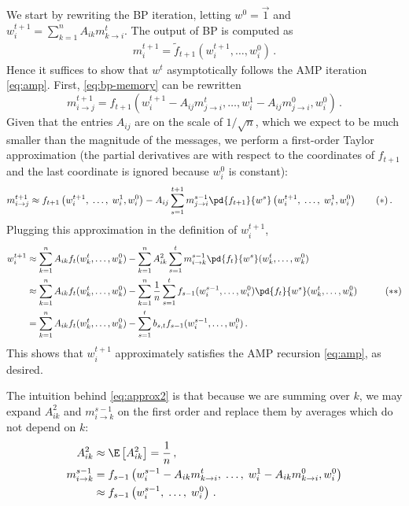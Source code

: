 \documentclass[12pt]{article}
\newcommand{\sdots}{\;\dots,\;}
\begin{document}
We start by rewriting the BP iteration, letting $w^0=\vec{1}$ and $w_i^{t+1}=\sum_{k=1}^n A_{ik} m^t_{k\to i}$. The output of BP is computed as
\begin{align*}
    m^{t+1}_i = \widetilde{f}_{t+1}\left(w_i^{t+1}, \dots, w_i^0\right)\,.
\end{align*}
Hence it suffices to show that $w^t$ asymptotically follows the AMP iteration \cref{eq:amp}. First, \cref{eq:bp-memory} can be rewritten
\[
    m^{t+1}_{i\to j} = f_{t+1}\left(w_i^{t+1} - A_{ij} m^t_{j\to i}, \ldots, w^1_{i} - A_{ij} m^0_{j\to i},w^0_i\right)\,.
\]
Given that the entries $A_{ij}$ are on the scale of $1/\sqrt n$, which we expect to be much smaller than the magnitude of the messages, we perform a first-order Taylor approximation (the partial derivatives
are with respect to the coordinates of $f_{t+1}$ and the last coordinate is ignored because $w^0_i$ is constant):
\begin{align*}
    m^{t+1}_{i\to j}&\approx f_{t+1}\left(w^{t+1}_i, \sdots w^1_i, w_i^0\right) - A_{ij}\sum_{s = 1}^{t+1} m_{j \to i}^{s-1} \pd{f_{t+1}}{w^s}\left(w^{t+1}_i, \sdots w^1_i, w_i^0\right)\label{eq:approx1}\tag{$\ast$}\,.
\end{align*}
Plugging this approximation in the definition of $w^{t+1}_i$,
\begingroup
\allowdisplaybreaks
\begin{align*}
    w^{t+1}_i &\approx \sum_{k =1}^n A_{ik} f_t(w_k^t, \dots, w_k^0) - \sum_{k=1}^n A_{ik}^2 \sum_{s=1}^{t}   m^{s-1}_{i\to k} \pd{f_{t}}{w^s}(w_k^t, \dots, w_k^0) &\\
    &\approx \sum_{k=1}^n A_{ik} f_t(w_k^t, \dots, w_k^0) - \sum_{k=1}^n \frac 1 n \sum_{s=1}^{t}   f_{s-1}(w_i^{s-1}, \dots, w_i^0) \pd{f_t}{w^s}(w_k^t, \dots, w_k^0) & \label{eq:approx2}\tag{$\ast\ast$}\\
    &= \sum_{k=1}^n A_{ik} f_t(w_k^t, \dots, w_k^0) -  \sum_{s=1}^{t} b_{s,t}f_{s-1}(w_i^{s-1}, \dots, w_i^0)\,.
\end{align*}
\endgroup
This shows that $w^{t+1}_i$ approximately satisfies the AMP recursion \cref{eq:amp}, as desired. 

The intuition behind \cref{eq:approx2} is that because we are summing over $k$,
we may expand $A_{ik}^2$ and $m_{i \to k}^{s-1}$ on the first order and replace them by averages which do not depend on $k$:
\begin{align*}
    A_{ik}^2 &\approx \E\left[A_{ik}^2\right] = \frac{1}{n}\,,\\
    m_{i\to k}^{s-1}&= f_{s-1}\left(w_i^{s-1} - A_{ik} m^t_{k\to i}, \sdots w^1_{i} - A_{ik} m^0_{k\to i},w^0_i\right)\\
    &\approx f_{s-1}\left(w_i^{s-1}, \sdots w^0_i\right)\,.
\end{align*}
\end{document}

